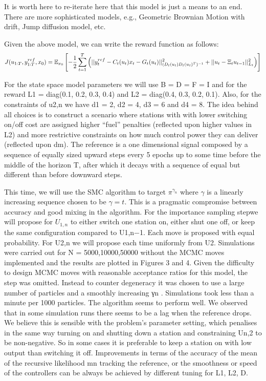 It is worth here to re-iterate here that this model is just a means to an end. There are more sophisticated models, e.g., Geometric Brownian Motion with drift, Jump diffusion model, etc.
 
Given the above model, we can write the reward function as follows:
\begin{equation}
  J(u_{1:T},y^{ref}_{1:T}, x_0) = \operatorname{\mathbb{E}}_{x_0}\left[ -\dfrac{1}{2}\displaystyle\sum^T_{t=1}\left(\vert\vert y^{ref}_t - C_t(u_t)x_t - G_t(u_t) \vert\vert^2_{(D_t(u_t)D_t(u_t)^T)^{-1}}  + \vert\vert u_t - \Xi_t u_{t-1} \vert\vert^2_{L_t}\right) \right]
\end{equation}
 
For the state space model parameters we will use B = D = F = I and for the reward L1 = diag(0.1, 0.2, 0.3, 0.4) and L2 = diag(0.4, 0.3, 0.2, 0.1). Also, for the constraints of u2,n we have d1 = 2, d2 = 4, d3 = 6 and d4 = 8. The idea behind all choices is to construct a scenario where stations with with lower switching on/off cost are assigned higher “fuel” penalties (reflected upon higher values in L2) and more restrictive constraints on how much control power they can deliver (reflected upon dm). The reference is a one dimensional signal composed by a sequence of equally sized upward steps every 5 epochs up to some time before the middle of the horizon T, after which it decays with a sequence of equal but different than before downward steps.
 
This time, we will use the SMC algorithm to target $\pi^{\gamma_n}$ where $\gamma$ is a linearly increasing sequence chosen to be $\gamma=t$. This is a pragmatic compromise between accuracy and good mixing in the algorithm. For the importance sampling stepwe will propose for $U_{1,n}$ to either switch one station on, either shut one off, or keep the same configuration compared to U1,n−1. Each move is proposed with equal probability. For U2,n we will propose each time uniformly from U2. Simulations were carried out for N = 5000,10000,50000 without the MCMC moves implemented and the results are plotted in Figures 3 and 4. Given the difficulty to design MCMC moves with reasonable acceptance ratios for this model, the step was omitted. Instead to counter degeneracy it was chosen to use a large number of particles and a smoothly increasing γn . Simulations took less than a minute per 1000 particles.
The algorithm seems to perform well. We observed that in some simulation runs there seems to be a lag when the reference drops. We believe this is sensible with the problem’s parameter setting, which penalises in the same way turning on and shutting down a station and constraining Un,2 to be non-negative. So in some cases it is preferable to keep a station on with low output than switching it off. Improvements in terms of the accuracy of the mean of the recursive likelihood mn tracking the reference, or the smoothness or speed of the controllers can be always be achieved by different tuning for L1, L2, D.
 
